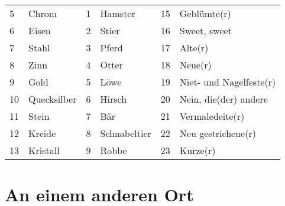 \documentclass[final]{multiversum}
\begin{document}
\begin{table*}[!t]
\begin{framed}
\begin{tabular}{p{}p{}p{}p{}p{}p{}}
5             & Chrom             	           & 1               & Hamster                & 15              & Geblümte(r)            \\
6             & Eisen                          & 2               & Stier                  & 16              & Sweet, sweet           \\
7             & Stahl                          & 3               & Pferd                  & 17              & Alte(r)                \\
8             & Zinn                           & 4               & Otter                  & 18              & Neue(r)                \\
9             & Gold                           & 5               & Löwe                   & 19              & Niet- und Nagelfeste(r)\\
10            & Quecksilber                    & 6               & Hirsch                 & 20              & Nein, die(der) andere  \\
11            & Stein                          & 7               & Bär                    & 21              & Vermaledeite(r)        \\
12            & Kreide                         & 8               & Schnabeltier           & 22              & Neu gestrichene(r)     \\
13            & Kristall                       & 9               & Robbe                  & 23              & Kurze(r)               \\
\end{tabular}
\end{framed}
\end{table*}


\section{An einem anderen Ort}
\end{document}
